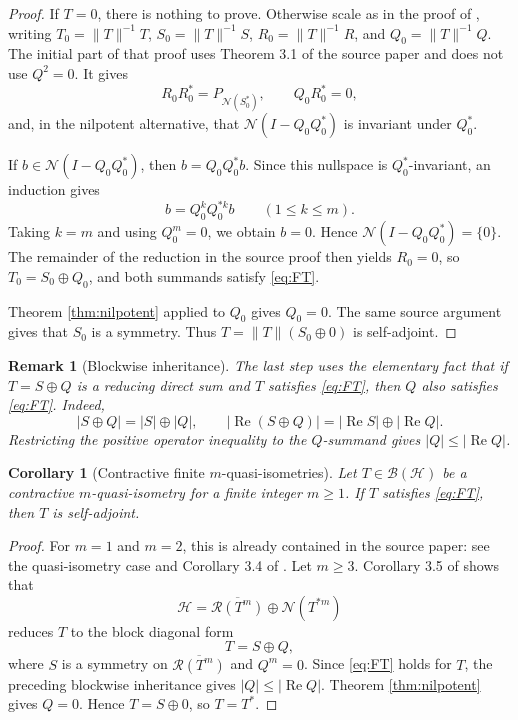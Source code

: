 \documentclass[11pt]{article}
\newtheorem{corollary}{Corollary}
\newtheorem{remark}{Remark}
\newcommand{\HH}{\mathcal H}
\newcommand{\BB}{\mathcal B}
\newcommand{\NN}{\mathcal N}
\newcommand{\RR}{\mathcal R}
\newcommand{\opRe}{\operatorname{Re}}
\begin{document}
\begin{proof}
If \(T=0\), there is nothing to prove. Otherwise scale as in the proof of
\cite[Proposition 3.3]{MbekhtaSuciu}, writing
\(T_0=\|T\|^{-1}T\), \(S_0=\|T\|^{-1}S\), \(R_0=\|T\|^{-1}R\), and
\(Q_0=\|T\|^{-1}Q\). The initial part of that proof uses Theorem 3.1 of the
source paper and does not use \(Q^2=0\). It gives
\[
  R_0R_0^*=P_{\NN(S_0^*)},\qquad Q_0R_0^*=0,
\]
and, in the nilpotent alternative, that
\(\NN(I-Q_0Q_0^*)\) is invariant under \(Q_0^*\).

If \(b\in\NN(I-Q_0Q_0^*)\), then \(b=Q_0Q_0^*b\). Since this nullspace is
\(Q_0^*\)-invariant, an induction gives
\[
  b=Q_0^kQ_0^{*k}b \qquad (1\leq k\leq m).
\]
Taking \(k=m\) and using \(Q_0^m=0\), we obtain \(b=0\). Hence
\(\NN(I-Q_0Q_0^*)=\{0\}\). The remainder of the reduction in the source proof
then yields \(R_0=0\), so \(T_0=S_0\oplus Q_0\), and both summands satisfy
\eqref{eq:FT}.

Theorem \ref{thm:nilpotent} applied to \(Q_0\) gives \(Q_0=0\). The same source
argument gives that \(S_0\) is a symmetry. Thus
\(T=\|T\|(S_0\oplus 0)\) is self-adjoint.
\end{proof}

\begin{remark}[Blockwise inheritance]
The last step uses the elementary fact that if \(T=S\oplus Q\) is a reducing
direct sum and \(T\) satisfies \eqref{eq:FT}, then \(Q\) also satisfies
\eqref{eq:FT}. Indeed,
\[
  |S\oplus Q|=|S|\oplus |Q|,
  \qquad
  |\opRe(S\oplus Q)|=|\opRe S|\oplus |\opRe Q|.
\]
Restricting the positive operator inequality to the \(Q\)-summand gives
\(|Q|\leq |\opRe Q|\).
\end{remark}

\begin{corollary}[Contractive finite \(m\)-quasi-isometries]
Let \(T\in\BB(\HH)\) be a contractive \(m\)-quasi-isometry for a finite integer
\(m\geq 1\). If \(T\) satisfies \eqref{eq:FT}, then \(T\) is self-adjoint.
\end{corollary}

\begin{proof}
For \(m=1\) and \(m=2\), this is already contained in the source paper: see the
quasi-isometry case and Corollary 3.4 of \cite{MbekhtaSuciu}. Let \(m\geq 3\).
Corollary 3.5 of \cite{MbekhtaSuciu} shows that
\[
  \HH=\overline{\RR(T^m)}\oplus \NN(T^{*m})
\]
reduces \(T\) to the block diagonal form
\[
  T=S\oplus Q,
\]
where \(S\) is a symmetry on \(\overline{\RR(T^m)}\) and \(Q^m=0\). Since
\eqref{eq:FT} holds for \(T\), the preceding blockwise inheritance gives
\(|Q|\leq |\opRe Q|\). Theorem \ref{thm:nilpotent} gives \(Q=0\). Hence
\(T=S\oplus 0\), so \(T=T^*\).
\end{proof}
\end{document}
